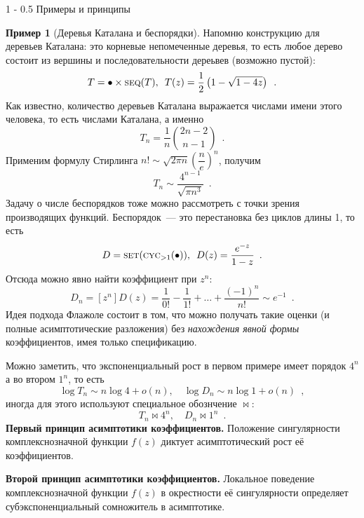 \documentclass[a5paper]{article}
\makeatletter
\theoremstyle{definition}
\newtheorem{example}{Пример}
\renewcommand{\section}{\@startsection
{section}%
{1}%
{\z@}%
{-\baselineskip}%
{0.5\baselineskip}%
{\centering\large\scshape}} %
\def\seq{\text{\textsc{seq}}}
\def\cyc{\text{\textsc{cyc}}}
\def\set{\text{\textsc{set}}}
\makeatother
\begin{document}
\section{Примеры и принципы}
\begin{example}[Деревья Каталана и беспорядки]
Напомню конструкцию для деревьев Каталана: это корневые непомеченные деревья, то
есть любое дерево состоит из вершины и последовательности дереьвев (возможно
пустой):
\begin{equation}
    T = \bullet \times \seq(T)
    , \enspace 
    T(z) = \dfrac12 \left(
        1 - \sqrt{1 - 4z}
    \right)
    \enspace .
\end{equation}
Как известно, количество деревьев Каталана выражается числами имени этого
человека, то есть числами Каталана, а именно
\begin{equation}
    T_n = \dfrac{1}{n} {2n - 2 \choose n - 1}
    \enspace .
\end{equation}
Применим формулу Стирлинга \( n! \sim \sqrt{2 \pi n} \left( \dfrac{n}{e}
\right)^n \), получим
\begin{equation}
    T_n \sim \dfrac{4^{n-1}}{\sqrt{\pi n^3}} \enspace .
\end{equation}
Задачу о числе беспорядков тоже можно рассмотреть с точки зрения производящих
функций. Беспорядок~--- это перестановка без циклов длины 1, то есть
\begin{equation}
    D = \set(\cyc_{>1}(\bullet))
    , \enspace
    D(z) = \dfrac{e^{-z}}{1 - z}
    \enspace . 
\end{equation}
Отсюда можно явно найти коэффициент при \(z^n \):
\begin{equation}
    D_n = [z^n] D(z) = \dfrac{1}{0!} - \dfrac{1}{1!} + \ldots +
\dfrac{(-1)^n}{n!} \sim e^{-1} \enspace .
\end{equation}
Идея подхода Флажоле состоит в том, что можно получать такие оценки (и полные
асимптотические разложения) без \textit{нахождения явной формы} коэффициентов,
имея только спецификацию.

Можно заметить, что экспоненциальный рост в первом примере имеет порядок \( 4^n
\) а во втором \( 1^n \), то есть 
\begin{equation}
    \log T_n \sim n \log 4 + o(n), \quad
    \log D_n \sim n \log 1 + o(n) \enspace ,
\end{equation}
иногда для этого используют специальное обознчение \( \bowtie \):
\begin{equation}
    T_n \bowtie 4^n , \quad
    D_n \bowtie 1^n \enspace .
\end{equation}
\textbf{Первый принцип асимптотики коэффициентов.} Положение сингулярности
комплекснозначной функции \( f(z) \) диктует асимптотический рост её
коэффициентов.

\textbf{Второй принцип асимптотики коэффициентов.} Локальное поведение
комплекснозначной функции \( f(z) \) в окрестности её сингулярности определяет
субэкспоненциальный сомножитель в асимптотике.
\end{example}
\end{document}

